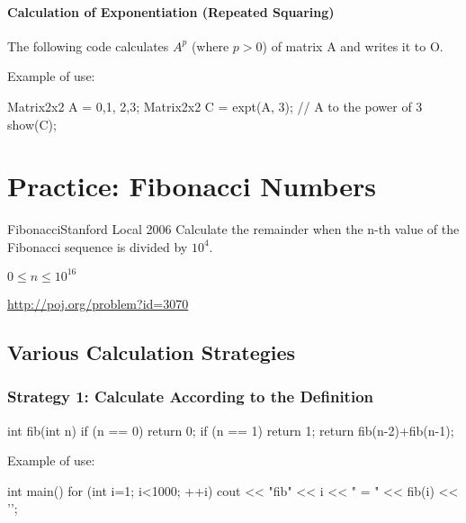 \paragraph{Calculation of Exponentiation (Repeated Squaring)}

The following code calculates $A^p$ (where $p>0$) of matrix A and writes it to O.


Example of use:

\begin{cbox}
  Matrix2x2 A = {0,1, 2,3};
  Matrix2x2 C = expt(A, 3); // A to the power of 3
  show(C);
\end{cbox}

\section{Practice: Fibonacci Numbers}

\begin{pbox}{Fibonacci}{Stanford Local 2006}
Calculate the remainder when the n-th value of the Fibonacci sequence is divided by $10^4$.

$0\le n \le 10^{16}$

\url{http://poj.org/problem?id=3070}
\end{pbox}

\subsection{Various Calculation Strategies}\label{section:fibonacci}

\subsubsection*{Strategy 1: Calculate According to the Definition}

\begin{cbox}
int fib(int n) {
    if (n == 0) return 0;
    if (n == 1) return 1;
    return fib(n-2)+fib(n-1);
}
\end{cbox}

Example of use:

\begin{cbox}
int main() {
  for (int i=1; i<1000; ++i)
    cout << "fib" << i << " = " << fib(i) << '\n';
}
\end{cbox}


